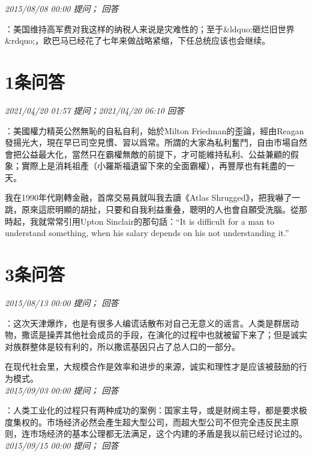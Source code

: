 \documentclass[twocolumn]{ctexart}
\begin{document}
\textit{\hfill\noindent\small 2015/08/08 00:00 提问； 回答}

：美国维持高军费对我这样的纳税人来说是灾难性的；至于\&ldquo;砸烂旧世界\&rdquo;，欧巴马已经花了七年来做战略紧缩，下任总统应该也会继续。\\

\section{1条问答}

\textit{\hfill\noindent\small 2021/04/20 01:57 提问；2021/04/20 06:10 回答}

：美國權力精英公然無恥的自私自利，始於Milton Friedman的歪論，經由Reagan發揚光大，現在早已司空見慣、習以爲常。所謂的大家為私利奮鬥，自由市場自然會把公益最大化，當然只在霸權無敵的前提下，才可能維持私利、公益兼顧的假象；實際上是消耗祖產（小羅斯福遺留下來的全面霸權），再豐厚也有耗盡的一天。

我在1990年代剛轉金融，首席交易員就叫我去讀《Atlas Shrugged》，把我嚇了一跳，原來這麽明顯的胡扯，只要和自我利益重叠，聰明的人也會自願受洗腦。從那時起，我就常常引用Upton Sinclair的那句話：“It is difficult for a man to understand something, when his salary depends on his not understanding it.”
\\

\section{3条问答}

\textit{\hfill\noindent\small 2015/08/13 00:00 提问； 回答}

：这次天津爆炸，也是有很多人编谎话散布对自己无意义的谣言。人类是群居动物，撒谎是操弄其他社会成员的手段，在演化的过程中也就被留下来了；但是诚实对族群整体是较有利的，所以撒谎基因只占了总人口的一部分。

在现代社会里，大规模合作是效率和进步的来源，诚实和理性才是应该被鼓励的行为模式。\\

\textit{\hfill\noindent\small 2015/09/03 00:00 提问； 回答}

：人类工业化的过程只有两种成功的案例：国家主导，或是财阀主导，都是要求极度集权的。市场经济必然会產生超大型公司，而超大型公司不但完全违反民主原则，连市场经济的基本公理都无法满足，这个内建的矛盾是我以前已经讨论过的。\\

\textit{\hfill\noindent\small 2015/09/15 00:00 提问； 回答}
\end{document}
